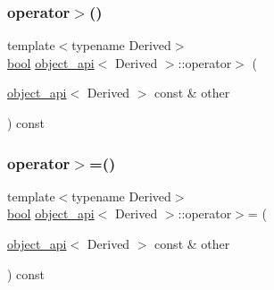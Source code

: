 \mbox{\label{classobject__api_ac99465e3bdd49159c9964ba927f63a19}} 
\subsubsection{\texorpdfstring{operator$>$()}{operator>()}}
{\footnotesize\ttfamily template$<$typename Derived$>$ \\
\mbox{\hyperlink{asdl_8h_af6a258d8f3ee5206d682d799316314b1}{bool}} \mbox{\hyperlink{classobject__api}{object\+\_\+api}}$<$ Derived $>$\+::operator$>$ (\begin{DoxyParamCaption}\item[{\mbox{\hyperlink{classobject__api}{object\+\_\+api}}$<$ Derived $>$ const \&}]{other }\end{DoxyParamCaption}) const\hspace{0.3cm}{\ttfamily [inline]}}

\mbox{\label{classobject__api_a774f6938db60a302a924c140a8b2b2db}} 
\subsubsection{\texorpdfstring{operator$>$=()}{operator>=()}}
{\footnotesize\ttfamily template$<$typename Derived$>$ \\
\mbox{\hyperlink{asdl_8h_af6a258d8f3ee5206d682d799316314b1}{bool}} \mbox{\hyperlink{classobject__api}{object\+\_\+api}}$<$ Derived $>$\+::operator$>$= (\begin{DoxyParamCaption}\item[{\mbox{\hyperlink{classobject__api}{object\+\_\+api}}$<$ Derived $>$ const \&}]{other }\end{DoxyParamCaption}) const\hspace{0.3cm}{\ttfamily [inline]}}

\mbox{\label{classobject__api_a1c874cdc51a00badff0938afca076365}} 
